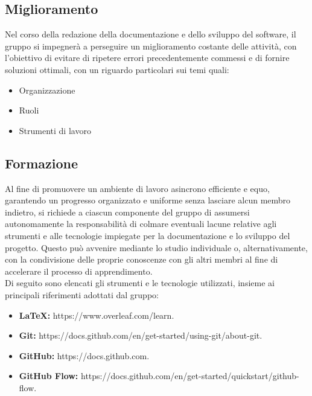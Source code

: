 \subsection{Miglioramento}
Nel corso della redazione della documentazione e dello sviluppo del software, il gruppo si impegnerà a perseguire un miglioramento costante delle attività, con l'obiettivo di evitare di ripetere errori precedentemente commessi e di fornire soluzioni ottimali, con un riguardo particolari sui temi quali:
\begin{itemize}
  \item{Organizzazione}
  \item{Ruoli}
  \item{Strumenti di lavoro}
\end{itemize}
\subsection{Formazione}
Al fine di promuovere un ambiente di lavoro asincrono efficiente e equo, garantendo un progresso organizzato e uniforme senza lasciare alcun membro indietro, si richiede a ciascun componente del gruppo di assumersi autonomamente la responsabilità di colmare eventuali lacune relative agli strumenti e alle tecnologie impiegate per la documentazione e lo sviluppo del progetto. Questo può avvenire mediante lo studio individuale o, alternativamente, con la condivisione delle proprie conoscenze con gli altri membri al fine di accelerare il processo di apprendimento.
\\Di seguito sono elencati gli strumenti e le tecnologie utilizzati, insieme ai principali riferimenti adottati dal gruppo:
\begin{itemize}
  \item{\textbf{LaTeX:}} https://www.overleaf.com/learn.
  \item{\textbf{Git:}} https://docs.github.com/en/get-started/using-git/about-git.
  \item{\textbf{GitHub:}} https://docs.github.com.
  \item{\textbf{GitHub Flow:}} https://docs.github.com/en/get-started/quickstart/github-flow.
\end{itemize}
